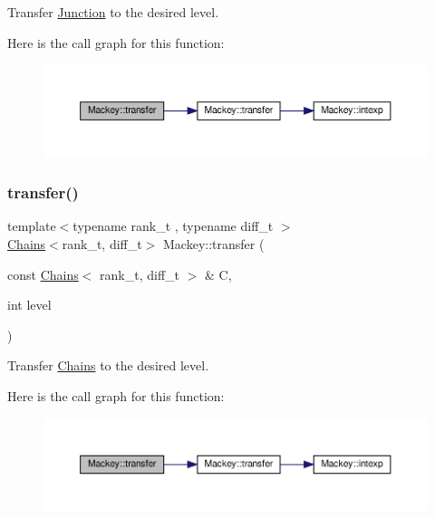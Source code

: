 Transfer \hyperlink{classMackey_1_1Junction}{Junction} to the desired level. 

Here is the call graph for this function\+:\nopagebreak
\begin{figure}[H]
\begin{center}
\leavevmode
\includegraphics[width=350pt]{namespaceMackey_a914aba7f868e67ae3fd9da3995678660_cgraph}
\end{center}
\end{figure}
\mbox{\label{namespaceMackey_a50837580391b5c6705e23c637d742b22}} 
\subsubsection{\texorpdfstring{transfer()}{transfer()}\hspace{0.1cm}{\footnotesize\ttfamily [4/6]}}
{\footnotesize\ttfamily template$<$typename rank\+\_\+t , typename diff\+\_\+t $>$ \\
\hyperlink{classMackey_1_1Chains}{Chains}$<$rank\+\_\+t, diff\+\_\+t$>$ Mackey\+::transfer (\begin{DoxyParamCaption}\item[{const \hyperlink{classMackey_1_1Chains}{Chains}$<$ rank\+\_\+t, diff\+\_\+t $>$ \&}]{C,  }\item[{int}]{level }\end{DoxyParamCaption})}



Transfer \hyperlink{classMackey_1_1Chains}{Chains} to the desired level. 

Here is the call graph for this function\+:\nopagebreak
\begin{figure}[H]
\begin{center}
\leavevmode
\includegraphics[width=350pt]{namespaceMackey_a50837580391b5c6705e23c637d742b22_cgraph}
\end{center}
\end{figure}
\mbox{\label{namespaceMackey_a0550bf97e47b3c319cb5e1bd81008d89}} 
